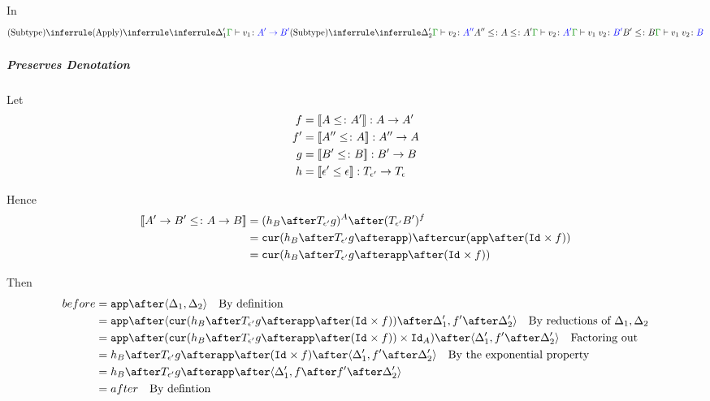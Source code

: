 \documentclass{report}
\begin{document}
        In
        \begin{equation}
            \ntreeruleII{Subtype}{
                \ntreeruleII{Apply}{
                    \treeruleI{
                        \D'_1
                    }{
                        \gtyperelation{v_1}{\fntype{A'}{B'}}
                    }
                }{
                    \ntreeruleII{Subtype}{
                        \treeruleI{\D'_2}{\gtyperelation{v_2}{A''}}
                        }{
                        A'' \subtype A \subtype A'
                    } {
                        \gtyperelation{v_2}{A'}
                    }
                }{
                    \gtyperelation{\apply{v_1}{v_2}}{B'}
                }
                }{
                B' \subtype B
            }{
                \gtyperelation{\apply{v_1}{v_2}}{B}
            }
        \end{equation}
        \subparagraph{Preserves Denotation}
            Let
            \begin{align*}
                f & = \deno{A\subtype A'}: A\rightarrow A' \\
                f' & = \deno{A''\subtype A}: A'' \rightarrow A \\
                g & = \deno{B' \subtype B}: B' \rightarrow B \\
                h & = \deno{\e' \subeffect \e}: \T{\e'}{} \rightarrow \T{\e}{}
            \end{align*}

            Hence 
            \begin{align*}
                \deno{\fntype{A'}{B'}\subtype \ab} & = (h_B\after\T{\e'}{g})^A \after (\T{\e'}{B'})^f \\
                & = \cur{h_B\after\T{\e'}{g}\after \app}\after\cur{\app\after(\Id{}\times f)}\\
                & = \cur {h_B\after\T{\e'}{g}\after\app\after(\Id{}\times f)}
            \end{align*}

            Then 
            \begin{align*}
                before & = \app\after\pr{\D_1}{\D_2}\qt{By definition}\\
                & = \app\after\pr{\cur {h_B\after\T{\e'}{g}\after\app\after(\Id{}\times f)}\after\D'_1}{f'\after\D'_2}\qt{By reductions of $\D_1, \D_2$}\\
                & = \app\after(\cur {h_B\after\T{\e'}{g}\after\app\after(\Id{}\times f)}\times\Id{A})\after\pr{\D'_1}{f'\after\D'_2} \qt{Factoring out}\\
                & = h_B\after\T{\e'}{g}\after\app\after(\Id{}\times f)\after\pr{\D'_1}{f'\after\D'_2}\qt{By the exponential property}\\
                & = h_B\after\T{\e'}{g}\after\app\after\pr{\D'_1}{f\after f'\after \D'_2}\\
                & = after\qt{By defintion}
            \end{align*}
       
\end{document}
